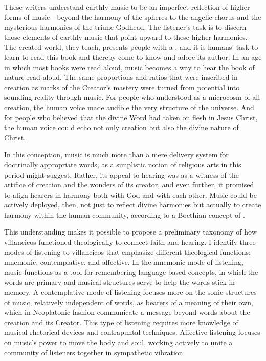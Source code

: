 \documentclass{vcbook-proposal}
\begin{document}
These writers understand earthly music to be an imperfect reflection of higher forms of music---beyond the harmony of the spheres to the angelic chorus and the mysterious harmonies of the triune Godhead. 
The listener's task is to discern those elements of earthly music that point upward to these higher harmonies.
The created world, they teach, presents people with a , and it is humans' task to learn to read this book and thereby come to know and adore its author.
In an age in which most books were read aloud, music becomes a way to hear the book of nature read aloud.
The same proportions and ratios that were inscribed in creation as marks of the Creator's mastery were turned from potential into sounding reality through music. 
For people who understood  as a microcosm of all creation, the human voice made audible the very structure of the universe.
And for people who believed that the divine Word had taken on flesh in Jesus Christ, the human voice could echo not only creation but also the divine nature of Christ.

In this conception, music is much more than a mere delivery system for doctrinally appropriate words, as a simplistic notion of religious arts in this period might suggest.
Rather, its appeal to hearing was as a witness of the artifice of creation and the wonders of its creator, and even further, it promised to align hearers in harmony both with God and with each other.
Music could be actively deployed, then, not just to reflect divine harmonies but actually to create harmony within the human community, according to a Boethian concept of .

This understanding makes it possible to propose a preliminary taxonomy of how villancicos functioned theologically to connect faith and hearing. 
I identify three modes of listening to villancicos that emphasize different theological functions: mnemonic, contemplative, and affective.
In the mnemonic mode of listening, music functions as a tool for remembering language-based concepts, in which the words are primary and musical structures serve to help the words stick in memory.
A contemplative mode of listening focuses more on the sonic structures of  music, relatively independent of words, as bearers of a meaning of their own, which in Neoplatonic fashion communicate a message beyond words about the creation and its Creator.
This type of listening requires more knowledge of musical-rhetorical devices and contrapuntal techniques. 
Affective listening focuses on music's power to move the body and soul, working actively to unite a community of listeners together in sympathetic vibration.
\end{document}
